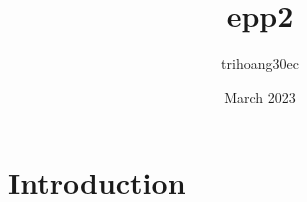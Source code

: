 \documentclass{article}
\title{epp2}
\author{trihoang30ec }
\date{March 2023}
\begin{document}
\maketitle

\section{Introduction}
\end{document}
